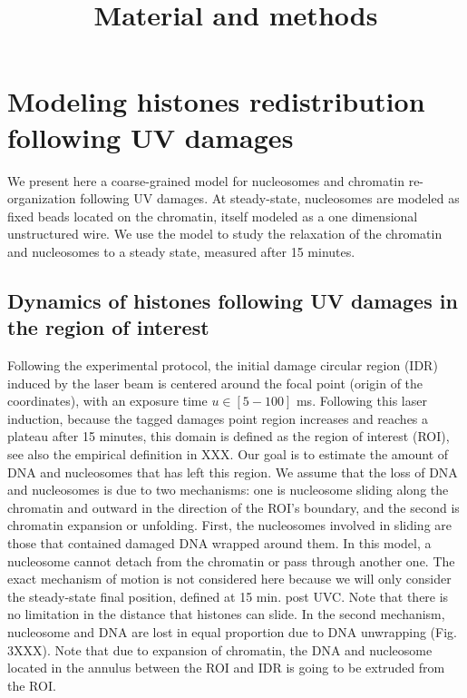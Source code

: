 \documentclass[12pt]{article}
\begin{document}
	
\title{ Material and methods}
\maketitle
\section{Modeling  histones redistribution following UV damages}
We present here a coarse-grained model for nucleosomes and chromatin re-organization following UV damages. At steady-state, nucleosomes are modeled as fixed beads located on the chromatin, itself modeled as a one dimensional unstructured wire. We use the model to study the relaxation of the chromatin and nucleosomes to a steady state, measured after 15 minutes.
\subsection{Dynamics of histones following UV damages in the region of interest}
Following the experimental protocol, the initial damage circular region (IDR) induced by the laser beam is centered around the focal point (origin of the coordinates), with an exposure time $u \in [5-100]$ ms. Following this laser induction, because the tagged damages point region increases and reaches a plateau after 15 minutes, this domain is defined as the region of interest (ROI), see also the empirical definition in XXX. Our goal is to estimate the amount of DNA and nucleosomes that has left this region. We assume that the loss of DNA and nucleosomes is due to two mechanisms: one is nucleosome sliding along the chromatin and outward in the direction of the ROI's boundary, and the second is chromatin expansion or unfolding. First, the nucleosomes involved in sliding are those that contained damaged DNA wrapped around them. In this model, a nucleosome cannot detach from the chromatin or pass through another one. The exact mechanism of motion is not considered here because we will only consider the steady-state final position, defined at 15 min. post UVC. Note that there is no limitation in the distance that histones can slide. In the second mechanism, nucleosome and DNA are lost in equal proportion due to DNA unwrapping (Fig. 3XXX). Note that due to expansion of chromatin, the DNA and nucleosome located in the annulus between the ROI and IDR is going to be extruded from the ROI.
\end{document}
